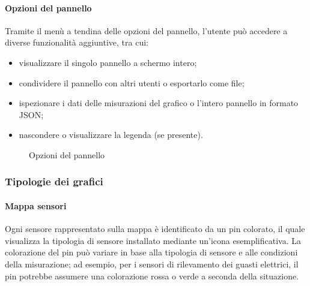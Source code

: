 \paragraph{Opzioni del pannello}
Tramite il menù a tendina delle opzioni del pannello, l'utente può accedere a diverse funzionalità aggiuntive, tra cui:
\begin{itemize}
    \item visualizzare il singolo pannello a schermo intero;
    \item condividere il pannello con altri utenti o esportarlo come file;
    \item ispezionare i dati delle misurazioni del grafico o l'intero pannello in formato JSON;
    \item nascondere o visualizzare la legenda (se presente).
\end{itemize}
\begin{figure}[H]
    \centering
    \caption{Opzioni del pannello}
    \label{fig:my_label}
\end{figure}


\subsubsection{Tipologie dei grafici}
\label{subsec:tipologie_grafici}

\paragraph{Mappa sensori}
\hypertarget{par:mappa_sensori}{}
Ogni sensore rappresentato sulla mappa è identificato da un pin colorato, il quale visualizza la tipologia di sensore installato mediante un'icona esemplificativa. La colorazione del pin può variare in base alla tipologia di sensore e alle condizioni della misurazione; ad esempio, per i sensori di rilevamento dei guasti elettrici, il pin potrebbe assumere una colorazione rossa o verde a seconda della situazione.

